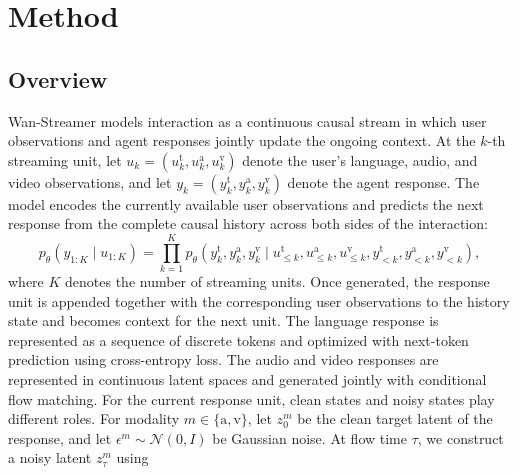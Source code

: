 \documentclass[]{style/style}
\begin{document}
\FloatBarrier









\section{Method}
\label{sec:method}

\subsection{Overview}
Wan-Streamer models interaction as a continuous causal stream in which user observations and agent responses jointly update the ongoing context. At the $k$-th streaming unit, let
$u_k=(u_k^{\mathrm{t}},u_k^{\mathrm{a}},u_k^{\mathrm{v}})$ denote the user's language, audio, and video observations, and let
$y_k=(y_k^{\mathrm{t}},y_k^{\mathrm{a}},y_k^{\mathrm{v}})$ denote the agent response. The model encodes the currently available user observations and predicts the next response from the complete causal history across both sides of the interaction:
\begin{equation}
\label{eq:ar-factorization}
    p_\theta(y_{1:K}\mid u_{1:K})=\prod_{k=1}^{K} p_\theta\!\left( y_k^{\mathrm{t}},y_k^{\mathrm{a}},y_k^{\mathrm{v}} \mid u_{\le k}^{\mathrm{t}},u_{\le k}^{\mathrm{a}},u_{\le k}^{\mathrm{v}}, y_{<k}^{\mathrm{t}},y_{<k}^{\mathrm{a}},y_{<k}^{\mathrm{v}} \right),
\end{equation}
where $K$ denotes the number of streaming units. Once generated, the response unit is appended together with the corresponding user observations to the history state and becomes context for the next unit. The language response is represented as a sequence of discrete tokens and optimized with next-token prediction using cross-entropy loss.
The audio and video responses are represented in continuous latent spaces and generated jointly with conditional flow matching. For the current response unit, clean states and noisy states play different roles. For modality $m\in\{\mathrm{a},\mathrm{v}\}$, let $z_0^m$ be the clean target latent of the response, and let $\epsilon^m\sim\mathcal N(0,I)$ be Gaussian noise. At flow time $\tau$, we construct a noisy latent $z_\tau^m$ using
\end{document}
